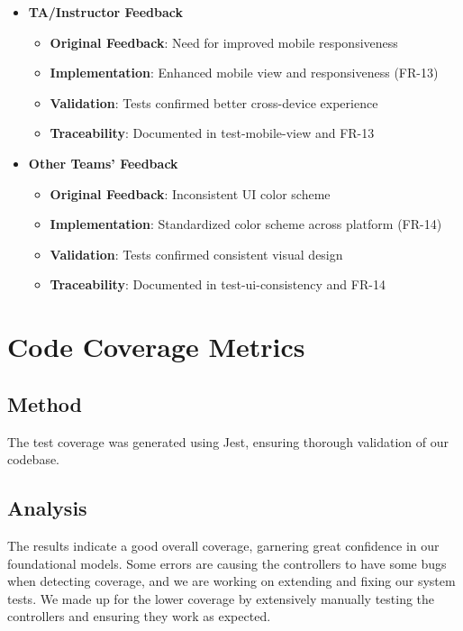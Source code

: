 \documentclass[12pt, titlepage]{article}
\begin{document}
\begin{itemize}
    \item \textbf{TA/Instructor Feedback}
    \begin{itemize}
        \item \textbf{Original Feedback}: Need for improved mobile responsiveness
        \item \textbf{Implementation}: Enhanced mobile view and responsiveness (FR-13)
        \item \textbf{Validation}: Tests confirmed better cross-device experience
        \item \textbf{Traceability}: Documented in test-mobile-view and FR-13
    \end{itemize}
    
    \item \textbf{Other Teams' Feedback}
    \begin{itemize}
        \item \textbf{Original Feedback}: Inconsistent UI color scheme
        \item \textbf{Implementation}: Standardized color scheme across platform (FR-14)
        \item \textbf{Validation}: Tests confirmed consistent visual design
        \item \textbf{Traceability}: Documented in test-ui-consistency and FR-14
    \end{itemize}
\end{itemize}


\section{Code Coverage Metrics}

\subsection{Method}

The test coverage was generated using Jest, ensuring thorough validation of our codebase.

\subsection{Analysis}
The results indicate a good overall coverage, garnering great confidence in our foundational models.
Some errors are causing the controllers to have some bugs when detecting coverage, and we are working on extending and fixing our system tests. We made up for the lower coverage by extensively manually testing the controllers and ensuring they work as expected.
\end{document}
